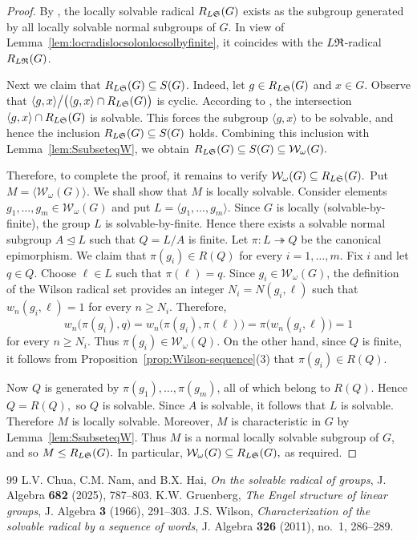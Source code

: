 \documentclass[10pt,a4paper]{amsart}
\numberwithin{equation}{section}
\newcommand{\LS}{\textup{L}\mathfrak{S}}
\numberwithin{equation}{section}
\begin{document}
\begin{proof}
By \cite[Lemma~4.6]{CNH2025}, the locally solvable radical $R_{\LS}(G)$ exists as the subgroup generated by all locally solvable normal subgroups of $G$. In view of Lemma~\ref{lem:locradislocsolonlocsolbyfinite}, it coincides with the $\textup{L}\mathfrak{R}$-radical $R_{\textup{L}\mathfrak{R}}(G)$. 

Next we claim that $R_{\LS}(G) \subseteq S(G)$. Indeed,
let $g \in R_{\LS}(G)$ and $x \in G$.  Observe that
$\langle g,x\rangle
\big/
\bigl(\langle g,x\rangle\cap R_{\LS}(G)\bigr)$
is cyclic. According to \cite[Lemma 2.5]{CNH2025}, the intersection $\langle g, x \rangle \cap R_{\LS}(G)$ is solvable.  This forces  the subgroup $ \langle g, x \rangle $ to be solvable, and hence the inclusion $ R_{\LS}(G) \subseteq S(G) $ holds.   Combining this inclusion with
Lemma~\ref{lem:SsubseteqW}, we obtain
$R_{\LS}(G)
\subseteq
S(G)
\subseteq
\mathcal{W}_{\omega}(G).$

Therefore, to complete the proof, it remains to verify $\mathcal{W}_{\omega}(G) \subseteq R_{\LS}(G).$
Put
$M=\bigl\langle \mathcal W_\omega(G)\bigr\rangle.$
We shall show that $M$ is locally solvable. Consider elements $g_1,\ldots,g_m\in\mathcal W_\omega(G)$ and put
$L=\langle g_1,\ldots,g_m\rangle.$ Since $G$ is locally (solvable-by-finite), the group $L$ is solvable-by-finite. Hence there exists a solvable normal subgroup $A\trianglelefteq L$ such that $Q=L/A$ is finite. Let $\pi\colon L\twoheadrightarrow Q$ be the canonical epimorphism. We claim that $\pi(g_i)\in R(Q)$ for every $i=1,\ldots,m$. Fix $i$ and let $q\in Q$. Choose $\ell\in L$ such that $\pi(\ell)=q$. Since $g_i\in\mathcal W_\omega(G)$, the definition of the Wilson radical set provides an integer $N_i=N(g_i,\ell)$ such that $w_n(g_i,\ell)=1$ for every $n\geq N_i$. Therefore, $$w_n\bigl(\pi(g_i),q\bigr) = w_n\bigl(\pi(g_i),\pi(\ell)\bigr) = \pi\bigl(w_n(g_i,\ell)\bigr) = 1$$ for every $n\geq N_i$. 
Thus $\pi(g_i)\in\mathcal W_\omega(Q).$ 
On the other hand, since $Q$ is finite, it follows from Proposition~\ref{prop:Wilson-sequence}\textup{(3)} that $\pi(g_i)\in R(Q).$

Now $Q$ is generated by $\pi(g_1),\ldots,\pi(g_m)$, all of which belong to $R(Q)$. Hence $Q=R(Q),$ so $Q$ is solvable. Since $A$ is solvable, it follows that $L$ is solvable. Therefore $M$ is locally solvable. Moreover, 
$M$ is characteristic in $G$ by Lemma~\ref{lem:SsubseteqW}. Thus $M$ is a normal locally solvable subgroup of $G$, and so $M\leq R_{\LS}(G).$ In particular, $\mathcal W_\omega(G)\subseteq R_{\LS}(G),$ as required.
\end{proof}


\begin{thebibliography}{99}
 L.V. Chua, C.M. Nam, and B.X. Hai, \emph{On the solvable radical of groups}, J. Algebra \textbf{682} (2025), 787--803.
 K.W. Gruenberg, \emph{The Engel structure of linear groups}, J. Algebra \textbf{3} (1966), 291--303.
 J.S. Wilson, \emph{Characterization of the solvable radical by a sequence of words}, J. Algebra \textbf{326} (2011), no.~1, 286--289.
\end{thebibliography}
\end{document}
